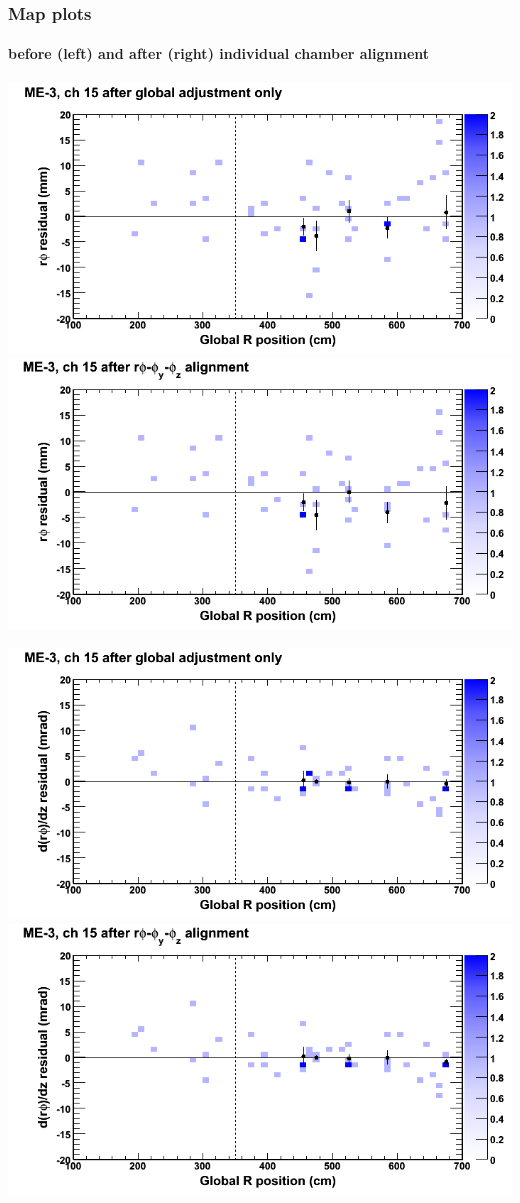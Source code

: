 \documentclass[compress]{beamer}
\begin{document}
\begin{frame}
\frametitle{Map plots}
\framesubtitle{before (left) and after (right) individual chamber alignment}
\includegraphics[width=0.5\linewidth]{ringmapplots_3dof/before_CSCvsr_mem3ch15_x.png} \includegraphics[width=0.5\linewidth]{ringmapplots_3dof/after_CSCvsr_mem3ch15_x.png}

\includegraphics[width=0.5\linewidth]{ringmapplots_3dof/before_CSCvsr_mem3ch15_dxdz.png} \includegraphics[width=0.5\linewidth]{ringmapplots_3dof/after_CSCvsr_mem3ch15_dxdz.png}
\end{frame}
\end{document}
